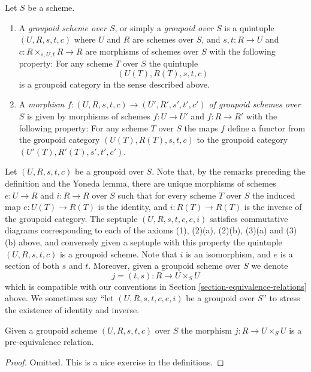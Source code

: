 \begin{definition}
\label{definition-groupoid}
Let $S$ be a scheme.
\begin{enumerate}
\item A {\it groupoid scheme over $S$}, or simply a
{\it groupoid over $S$} is a
quintuple $(U, R, s, t, c)$ where
$U$ and $R$ are schemes over $S$, and
$s, t : R \to U$ and $c : R \times_{s, U, t} R \to R$
are morphisms of schemes over $S$ with the
following property: For any scheme
$T$ over $S$ the quintuple
$$
(U(T), R(T), s, t, c)
$$
is a groupoid category in the sense described above.
\item A {\it morphism
$f : (U, R, s, t, c) \to (U', R', s', t', c')$
of groupoid schemes over $S$} is given by morphisms
of schemes $f : U \to U'$ and $f : R \to R'$ with the
following property:  For any scheme
$T$ over $S$ the maps $f$ define a functor from the
groupoid category $(U(T), R(T), s, t, c)$ to the
groupoid category $(U'(T), R'(T), s', t', c')$.
\end{enumerate}
\end{definition}

\noindent
Let $(U, R, s, t, c)$ be a groupoid over $S$.
Note that, by the remarks preceding the definition and the Yoneda lemma,
there are unique morphisms of schemes
$e : U \to R$ and
$i : R \to R$ over $S$ such that for every scheme $T$ over $S$
the induced map $e : U(T) \to R(T)$ is the identity, and
$i : R(T) \to R(T)$ is the inverse of
the groupoid category. The septuple $(U, R, s, t, c, e, i)$
satisfies commutative diagrams corresponding to each of the
axioms (1), (2)(a), (2)(b), (3)(a) and (3)(b) above, and conversely
given a septuple with this property the quintuple $(U, R, s, t, c)$
is a groupoid scheme. Note that $i$ is an isomorphism,
and $e$ is a section of both $s$ and $t$.
Moreover, given a groupoid scheme over $S$ we denote
$$
j = (t, s) : R \longrightarrow U \times_S U
$$
which is compatible with our conventions in Section
\ref{section-equivalence-relations} above.
We sometimes say ``let $(U, R, s, t, c, e, i)$ be a
groupoid over $S$'' to stress the existence of identity and
inverse.

\begin{lemma}
\label{lemma-groupoid-pre-equivalence}
Given a groupoid scheme $(U, R, s, t, c)$ over $S$
the morphism $j : R \to U \times_S U$ is a pre-equivalence
relation.
\end{lemma}

\begin{proof}
Omitted.
This is a nice exercise in the definitions.
\end{proof}

